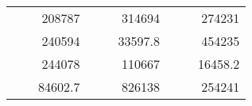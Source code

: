 \begin{table}[H]
\begin{tabular}{|ccrccrccc}
\rowcolor[HTML]{DAE8FC} 
\multicolumn{1}{|c|}{\cellcolor[HTML]{FFFFC7}}                                & \multicolumn{1}{c|}{\cellcolor[HTML]{DAE8FC}}                      & \multicolumn{1}{r|}{\cellcolor[HTML]{DAE8FC}208787}    & \multicolumn{1}{c|}{\cellcolor[HTML]{FFFFC7}}                                & \multicolumn{1}{c|}{\cellcolor[HTML]{DAE8FC}}                       & \multicolumn{1}{r|}{\cellcolor[HTML]{DAE8FC}314694}    & \multicolumn{1}{c|}{\cellcolor[HTML]{FFFFC7}}                                & \multicolumn{1}{c|}{\cellcolor[HTML]{DAE8FC}}                      & \multicolumn{1}{r|}{\cellcolor[HTML]{DAE8FC}274231}    \\ \cline{3-3} \cline{6-6} \cline{9-9} 
\multicolumn{1}{|c|}{\cellcolor[HTML]{FFFFC7}}                                & \multicolumn{1}{c|}{\cellcolor[HTML]{DAE8FC}}                      & \multicolumn{1}{r|}{\cellcolor[HTML]{DDFDFF}240594}    & \multicolumn{1}{c|}{\cellcolor[HTML]{FFFFC7}}                                & \multicolumn{1}{c|}{\cellcolor[HTML]{DAE8FC}}                       & \multicolumn{1}{r|}{\cellcolor[HTML]{DDFDFF}33597.8}   & \multicolumn{1}{c|}{\cellcolor[HTML]{FFFFC7}}                                & \multicolumn{1}{c|}{\cellcolor[HTML]{DAE8FC}}                      & \multicolumn{1}{r|}{\cellcolor[HTML]{DDFDFF}454235}    \\ \cline{3-3} \cline{6-6} \cline{9-9} 
\rowcolor[HTML]{DAE8FC} 
\multicolumn{1}{|c|}{\cellcolor[HTML]{FFFFC7}}                                & \multicolumn{1}{c|}{\cellcolor[HTML]{DAE8FC}}                      & \multicolumn{1}{r|}{\cellcolor[HTML]{DAE8FC}244078}    & \multicolumn{1}{c|}{\cellcolor[HTML]{FFFFC7}}                                & \multicolumn{1}{c|}{\cellcolor[HTML]{DAE8FC}}                       & \multicolumn{1}{r|}{\cellcolor[HTML]{DAE8FC}110667}    & \multicolumn{1}{c|}{\cellcolor[HTML]{FFFFC7}}                                & \multicolumn{1}{c|}{\cellcolor[HTML]{DAE8FC}}                      & \multicolumn{1}{r|}{\cellcolor[HTML]{DAE8FC}16458.2}   \\ \cline{3-3} \cline{6-6} \cline{9-9} 
\multicolumn{1}{|c|}{\cellcolor[HTML]{FFFFC7}}                                & \multicolumn{1}{c|}{\cellcolor[HTML]{DAE8FC}}                      & \multicolumn{1}{r|}{\cellcolor[HTML]{DDFDFF}84602.7}   & \multicolumn{1}{c|}{\cellcolor[HTML]{FFFFC7}}                                & \multicolumn{1}{c|}{\cellcolor[HTML]{DAE8FC}}                       & \multicolumn{1}{r|}{\cellcolor[HTML]{DDFDFF}826138}    & \multicolumn{1}{c|}{\cellcolor[HTML]{FFFFC7}}                                & \multicolumn{1}{c|}{\cellcolor[HTML]{DAE8FC}}                      & \multicolumn{1}{r|}{\cellcolor[HTML]{DDFDFF}254241}    \\ \cline{3-3} \cline{6-6} \cline{9-9} 

\end{tabular}
\end{table}
